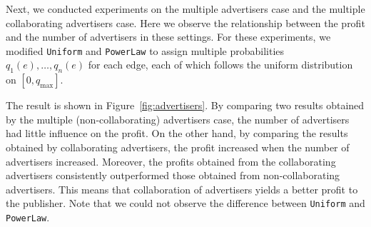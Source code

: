\documentclass[letterpaper]{article}
\theoremstyle{definition}
\begin{document}
Next, we conducted experiments on the multiple advertisers case and the multiple collaborating advertisers case.
Here we observe the relationship between the profit and the number of advertisers in these settings.
For these experiments, we modified \texttt{Uniform} and \texttt{PowerLaw}
to assign multiple probabilities $q_1(e), \ldots, q_n(e)$ for each edge, each of which follows the uniform distribution on $[0, q_{\text{max}}]$.

The result is shown in Figure~\ref{fig:advertisers}.
By comparing two results obtained by the multiple (non-collaborating) advertisers case, the number of advertisers had little influence on the profit.
On the other hand, by comparing the results obtained by collaborating advertisers, the profit increased when the number of advertisers increased.
Moreover, the profits obtained from the collaborating advertisers consistently outperformed those obtained from non-collaborating advertisers.
This means that collaboration of advertisers yields a better profit to the publisher.
Note that we could not observe the difference between \texttt{Uniform} and \texttt{PowerLaw}.
\end{document}
